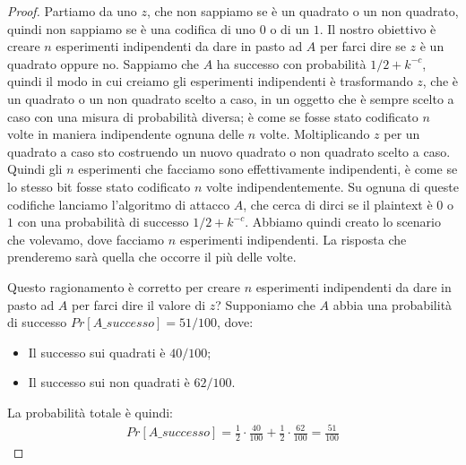 \begin{proof}
Partiamo da uno $z$, che non sappiamo se è un quadrato o un non quadrato, quindi non sappiamo se è una codifica di uno $0$ o di un $1$. Il nostro obiettivo è creare $n$ esperimenti indipendenti da dare in pasto ad $A$ per farci dire se $z$ è un quadrato oppure no. Sappiamo che $A$ ha successo con probabilità $1/2 + k^{-c}$, quindi il modo in cui creiamo gli esperimenti indipendenti è trasformando $z$, che è un quadrato o un non quadrato scelto a caso, in un oggetto che è sempre scelto a caso con una misura di probabilità diversa; è come se fosse stato codificato $n$ volte in maniera indipendente ognuna delle $n$ volte. Moltiplicando $z$ per un quadrato a caso sto costruendo un nuovo quadrato o non quadrato scelto a caso. Quindi gli $n$ esperimenti che facciamo sono effettivamente indipendenti, è come se lo stesso bit fosse stato codificato $n$ volte indipendentemente. Su ognuna di queste codifiche lanciamo l'algoritmo di attacco $A$, che cerca di dirci se il plaintext è $0$ o $1$ con una probabilità di successo $1/2 + k^{-c}$. Abbiamo quindi creato lo scenario che volevamo, dove facciamo $n$ esperimenti indipendenti. La risposta che prenderemo sarà quella che occorre il più delle volte. 

Questo ragionamento è corretto per creare $n$ esperimenti indipendenti da dare in pasto ad $A$ per farci dire il valore di $z$? 
Supponiamo che $A$ abbia una probabilità di successo $Pr[A\_successo] = 51/100$, dove:
\begin{itemize}
    \item Il successo sui quadrati è $40/100$;
    \item Il successo sui non quadrati è $62/100$.
\end{itemize}
\noindent La probabilità totale è quindi:
\begin{align*}
    Pr[A\_successo] = \frac{1}{2} \cdot \frac{40}{100} + \frac{1}{2} \cdot \frac{62}{100} = \frac{51}{100}
\end{align*}


\end{proof}
